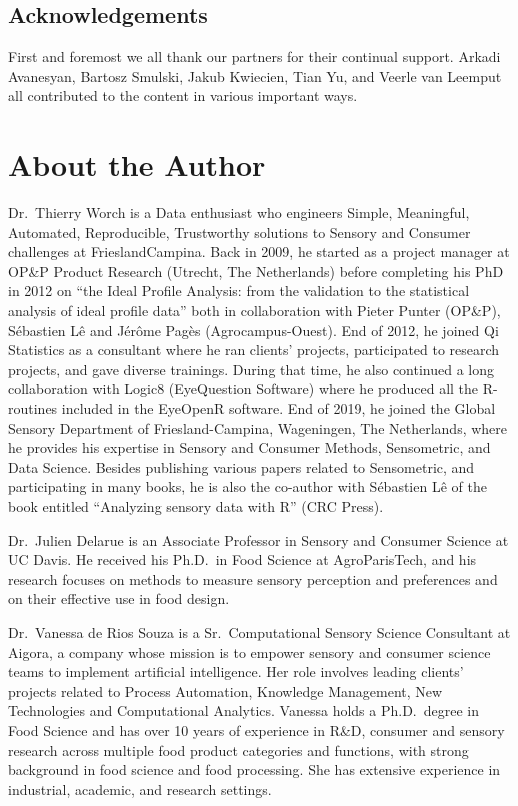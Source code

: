 \documentclass[
]{krantz}
\begin{document}
\hypertarget{acknowledgements}{%
\section*{Acknowledgements}\label{acknowledgements}}


First and foremost we all thank our partners for their continual support. Arkadi Avanesyan, Bartosz Smulski, Jakub Kwiecien, Tian Yu, and Veerle van Leemput all contributed to the content in various important ways.

\hypertarget{about-the-author}{%
\chapter*{About the Author}\label{about-the-author}}


Dr.~Thierry Worch is a Data enthusiast who engineers Simple, Meaningful, Automated, Reproducible, Trustworthy solutions to Sensory and Consumer challenges at FrieslandCampina.
Back in 2009, he started as a project manager at OP\&P Product Research (Utrecht, The Netherlands) before completing his PhD in 2012 on ``the Ideal Profile Analysis: from the validation to the statistical analysis of ideal profile data'' both in collaboration with Pieter Punter (OP\&P), Sébastien Lê and Jérôme Pagès (Agrocampus-Ouest). End of 2012, he joined Qi Statistics as a consultant where he ran clients' projects, participated to research projects, and gave diverse trainings. During that time, he also continued a long collaboration with Logic8 (EyeQuestion Software) where he produced all the R-routines included in the EyeOpenR software. End of 2019, he joined the Global Sensory Department of Friesland-Campina, Wageningen, The Netherlands, where he provides his expertise in Sensory and Consumer Methods, Sensometric, and Data Science.
Besides publishing various papers related to Sensometric, and participating in many books, he is also the co-author with Sébastien Lê of the book entitled ``Analyzing sensory data with R'' (CRC Press).

Dr.~Julien Delarue is an Associate Professor in Sensory and Consumer Science at UC Davis. He received his Ph.D.~in Food Science at AgroParisTech, and his research focuses on methods to measure sensory perception and preferences and on their effective use in food design.

Dr.~Vanessa de Rios Souza is a Sr.~Computational Sensory Science Consultant at Aigora, a company whose mission is to empower sensory and consumer science teams to implement artificial intelligence. Her role involves leading clients' projects related to Process Automation, Knowledge Management, New Technologies and Computational Analytics. Vanessa holds a Ph.D.~degree in Food Science and has over 10 years of experience in R\&D, consumer and sensory research across multiple food product categories and functions, with strong background in food science and food processing. She has extensive experience in industrial, academic, and research settings.
\end{document}
